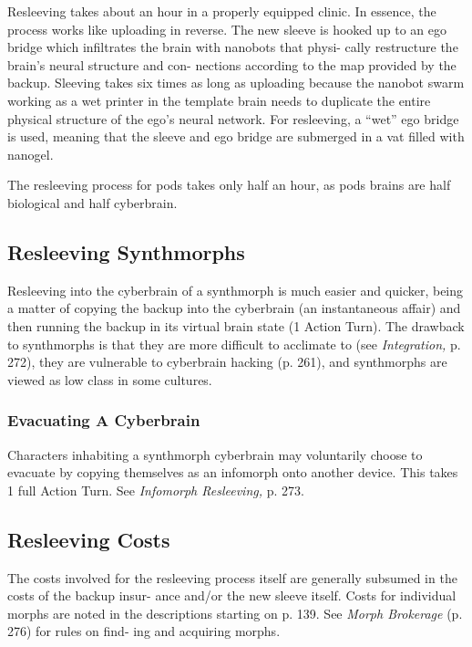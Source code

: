 Resleeving takes about an hour in a properly equipped 
clinic. In essence, the process works like uploading in 
reverse. The new sleeve is hooked up to an ego bridge 
which infiltrates the brain with nanobots that physi-
cally restructure the brain's neural structure and con-
nections according to the map provided by the backup. 
Sleeving takes six times as long as uploading because 
the nanobot swarm working as a wet printer in the 
template brain needs to duplicate the entire physical 
structure of the ego's neural network. For resleeving, a 
``wet'' ego bridge is used, meaning that the sleeve and 
ego bridge are submerged in a vat filled with nanogel.

The resleeving process for pods takes only half an hour, 
as pods brains are half biological and half cyberbrain.

\subsection{Resleeving Synthmorphs}

Resleeving into the cyberbrain of a synthmorph is much 
easier and quicker, being a matter of copying the backup 
into the cyberbrain (an instantaneous affair) and then 
running the backup in its virtual brain state (1 Action 
Turn). The drawback to synthmorphs is that they are 
more difficult to acclimate to (see \textit{Integration,} p. 272), 
they are vulnerable to cyberbrain hacking (p. 261), and 
synthmorphs are viewed as low class in some cultures.

\subsubsection{Evacuating A Cyberbrain}

Characters inhabiting a synthmorph cyberbrain may 
voluntarily choose to evacuate by copying themselves 
as an infomorph onto another device. This takes 1 full 
Action Turn. See \textit{Infomorph Resleeving,} p. 273.

\subsection{Resleeving Costs}

The costs involved for the resleeving process itself are 
generally subsumed in the costs of the backup insur-
ance and/or the new sleeve itself. Costs for individual 
morphs are noted in the descriptions starting on p. 
139. See \textit{Morph Brokerage} (p. 276) for rules on find-
ing and acquiring morphs.


